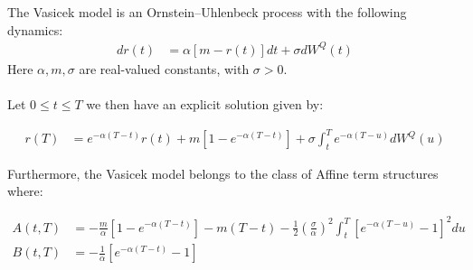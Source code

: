 \begin{proposition}
\label{prop: Vasicek_ATS}
The Vasicek model is an Ornstein–Uhlenbeck process with the following dynamics: 
\begin{align*}
dr(t) &= \alpha[m - r(t)]dt + \sigma dW^{Q}(t)    
\end{align*}
Here $\alpha, m, \sigma$ are real-valued constants, with $\sigma > 0$.
\\~\\
Let $0 \leq t \leq T$ we then have an explicit solution given by:

\begin{align*}
r(T) &= e^{-\alpha(T-t)}r(t) + m[1-e^{-\alpha(T-t)}] 
+ \sigma \int_{t}^{T}e^{-\alpha(T-u)}dW^{Q}(u)
\end{align*}

Furthermore, the Vasicek model belongs to the class of Affine term structures where: 

\begin{align*}
A(t,T) &= -\frac{m}{\alpha}\left[
1-e^{-\alpha(T-t)}
\right] - m(T-t) - 
\frac{1}{2}
\left(
\frac{\sigma}{\alpha}
\right)^{2}
\int_{t}^{T}
\left[
e^{-\alpha(T-u)}-1
\right]^{2}du \\ 
B(t,T) &= -\frac{1}{\alpha}\left[
e^{-\alpha(T-t)}-1
\right]
\end{align*}
\end{proposition}




\newpage


